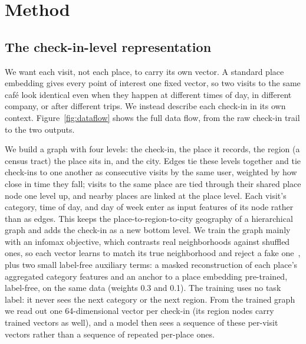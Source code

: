 \section{Method}
\label{sec:method}

\subsection{The check-in-level representation}
\label{sec:method-rep}

We want each visit, not each place, to carry its own vector. A standard place
embedding gives every point of interest one fixed vector, so two visits to
the same caf\'e look identical even when they happen at different times of day,
in different company, or after different trips. We instead describe each
check-in in its own context. Figure~\ref{fig:dataflow} shows the full data flow,
from the raw check-in trail to the two outputs.

We build a graph with four levels: the check-in, the place it records, the
region (a census tract) the place sits in, and the city. Edges tie these levels
together and tie check-ins to one another as consecutive visits by the same
user, weighted by how close in time they fall; visits to the same place are
tied through their shared place node one level up, and nearby places are linked
at the place level. Each visit's category, time of day, and day of week enter
as input features of its node rather than as edges. This keeps the
place-to-region-to-city geography of a
hierarchical graph and adds the check-in as a new bottom level. We train the
graph mainly with an infomax objective, which contrasts real neighborhoods against
shuffled ones, so each vector learns to match its true neighborhood and reject a
fake one~\cite{velickovic2019dgi,huang2023hgi}, plus two small label-free
auxiliary terms: a masked reconstruction of each place's aggregated category
features and an anchor to a place embedding pre-trained, label-free,
on the same data (weights 0.3 and 0.1). The training
uses no task label: it
never sees the next category or the next region. From the trained graph we read
out one 64-dimensional vector per check-in (its region nodes carry trained
vectors as well), and a model then sees a sequence of these per-visit
vectors rather than a sequence of repeated per-place ones.

